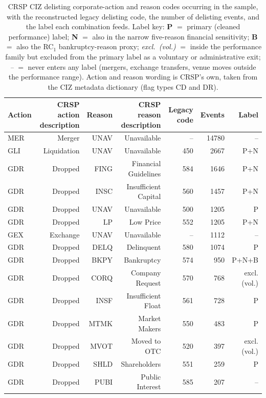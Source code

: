 \begin{table}
\centering
\caption{CRSP CIZ delisting corporate-action and reason codes occurring in the sample, with the reconstructed legacy delisting code, the number of delisting events, and the label each combination feeds. Label key: \textbf{P} $=$ primary (cleaned performance) label; \textbf{N} $=$ also in the narrow five-reason financial sensitivity; \textbf{B} $=$ also the RC$_1$ bankruptcy-reason proxy; \textit{excl.\ (vol.)} $=$ inside the performance family but excluded from the primary label as a voluntary or administrative exit; \textit{--} $=$ never enters any label (mergers, exchange transfers, venue moves outside the performance range). Action and reason wording is CRSP's own, taken from the CIZ metadata dictionary (flag types CD and DR).}
\label{tab:ciz_code_dictionary}
\scriptsize
\setlength{\tabcolsep}{3pt}
\begin{tabular}{lrrrrrr}
\toprule
Action & CRSP action description & Reason & CRSP reason description & Legacy code & Events & Label \\
\midrule
MER & Merger & UNAV & Unavailable & -- & 14780 & -- \\
GLI & Liquidation & UNAV & Unavailable & 450 & 2667 & P+N \\
GDR & Dropped & FING & Financial Guidelines & 584 & 1646 & P+N \\
GDR & Dropped & INSC & Insufficient Capital & 560 & 1457 & P+N \\
GDR & Dropped & UNAV & Unavailable & 500 & 1205 & P \\
GDR & Dropped & LP & Low Price & 552 & 1205 & P+N \\
GEX & Exchange & UNAV & Unavailable & -- & 1112 & -- \\
GDR & Dropped & DELQ & Delinquent & 580 & 1074 & P \\
GDR & Dropped & BKPY & Bankruptcy & 574 & 950 & P+N+B \\
GDR & Dropped & CORQ & Company Request & 570 & 768 & excl. (vol.) \\
GDR & Dropped & INSF & Insufficient Float & 561 & 728 & P \\
GDR & Dropped & MTMK & Market Makers & 550 & 483 & P \\
GDR & Dropped & MVOT & Moved to OTC & 520 & 397 & excl. (vol.) \\
GDR & Dropped & SHLD & Shareholders & 551 & 259 & P \\
GDR & Dropped & PUBI & Public Interest & 585 & 207 & -- \\

\end{tabular}
\end{table}
